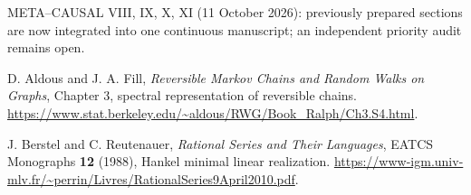 \documentclass[11pt,a4paper,oneside]{book}
\begin{document}
\begin{enumerate}[label={[\arabic*]},leftmargin=*,itemsep=7pt]
\item META--CAUSAL VIII, IX, X, XI (11 October 2026): previously prepared sections are now integrated into one continuous manuscript; an independent priority audit remains open.
\item D. Aldous and J. A. Fill, \emph{Reversible Markov Chains and Random Walks on Graphs}, Chapter 3, spectral representation of reversible chains. \url{https://www.stat.berkeley.edu/~aldous/RWG/Book_Ralph/Ch3.S4.html}.
\item J. Berstel and C. Reutenauer, \emph{Rational Series and Their Languages}, EATCS Monographs \textbf{12} (1988), Hankel minimal linear realization. \url{https://www-igm.univ-mlv.fr/~perrin/Livres/RationalSeries9April2010.pdf}.
\end{enumerate}
\end{document}
